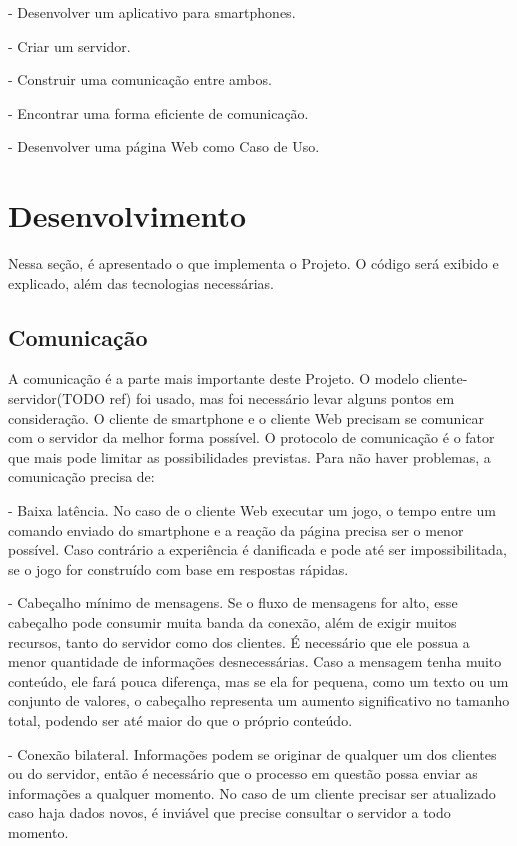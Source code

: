 \documentclass[a4paper,12pt]{article}
\begin{document}
- Desenvolver um aplicativo para smartphones.

- Criar um servidor.

- Construir uma comunicação entre ambos.

- Encontrar uma forma eficiente de comunicação.

- Desenvolver uma página Web como Caso de Uso.



\newpage
\section{Desenvolvimento}

Nessa seção, é apresentado o que implementa o Projeto. O código será exibido e explicado, além das tecnologias necessárias.


\subsection{Comunicação}

A comunicação é a parte mais importante deste Projeto. O modelo cliente-servidor(TODO ref) foi usado, mas foi necessário levar alguns pontos em consideração. O cliente de smartphone e o cliente Web precisam se comunicar com o servidor da melhor forma possível. O protocolo de comunicação é o fator que mais pode limitar as possibilidades previstas. Para não haver problemas, a comunicação precisa de:

- Baixa latência. No caso de o cliente Web executar um jogo, o tempo entre um comando enviado do smartphone e a reação da página precisa ser o menor possível. Caso contrário a experiência é danificada e pode até ser impossibilitada, se o jogo for construído com base em respostas rápidas.

- Cabeçalho mínimo de mensagens. Se o fluxo de mensagens for alto, esse cabeçalho pode consumir muita banda da conexão, além de exigir muitos recursos, tanto do servidor como dos clientes. É necessário que ele possua a menor quantidade de informações desnecessárias. Caso a mensagem tenha muito conteúdo, ele fará pouca diferença, mas se ela for pequena, como um texto ou um conjunto de valores, o cabeçalho representa um aumento significativo no tamanho total, podendo ser até maior do que o próprio conteúdo.

- Conexão bilateral. Informações podem se originar de qualquer um dos clientes ou do servidor, então é necessário que o processo em questão possa enviar as informações a qualquer momento. No caso de um cliente precisar ser atualizado caso haja dados novos, é inviável que precise consultar o servidor a todo momento.
\end{document}

